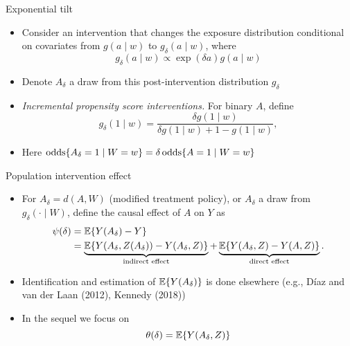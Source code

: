 \documentclass{beamer}
\begin{document}
\begin{frame}{Exponential tilt}
  \begin{itemize}
  \item Consider an intervention that changes the exposure
    distribution conditional on covariates from $g(a\mid w)$ to
    $g_\delta(a\mid w)$, where
    \begin{equation*}
      g_\delta(a \mid w) \propto \exp(\delta a) g(a \mid w)
    \end{equation*}
  \item Denote $A_\delta$ a draw from this post-intervention
    distribution $g_\delta$
  \end{itemize}
  \begin{example}[Kennedy, 2018]
    \begin{itemize}
    \item \textit{Incremental propensity score interventions.} For
    binary $A$, define
      \begin{equation*}
        g_\delta(1 \mid w) = \frac{\delta g(1 \mid w)}{\delta g(1 \mid w) + 1
          - g(1\mid w)},
      \end{equation*}

    \item Here
      $ \operatorname{odds}\{A_\delta= 1\mid W=w\} = \delta\operatorname{odds}\{A=1\mid W=w\}$
    \end{itemize}
  \end{example}

\note{
}

\end{frame}


\begin{frame}{Population intervention effect}
  \begin{itemize}
  \item For $A_\delta= d(A,W)$ (modified treatment policy), or
    $A_\delta$ a draw from $g_\delta(\cdot\mid W)$, define the causal
    effect of $A$ on $Y$ as
    \begin{align*}
        \psi(\delta) &= \mathbb{E}\{Y(A_\delta) - Y\}\\
                     &=\underbrace{\mathbb{E}\{Y(A_\delta, Z(A_\delta)) -
          Y(A_\delta, Z)\}}_{\text{indirect effect}} +
          \underbrace{\mathbb{E}\{Y(A_\delta, Z) -
          Y(A, Z)\}}_{\text{direct effect}}.
    \end{align*}
  \item Identification and estimation of $\mathbb{E}\{Y(A_\delta)\}$ is done
    elsewhere (e.g., D\'iaz and van der Laan (2012), Kennedy (2018))
  \item In the sequel we focus on
    \[\theta(\delta) = \mathbb{E}\{Y(A_\delta, Z)\}\]
  \end{itemize}

\note{
}

\end{frame}
\end{document}
